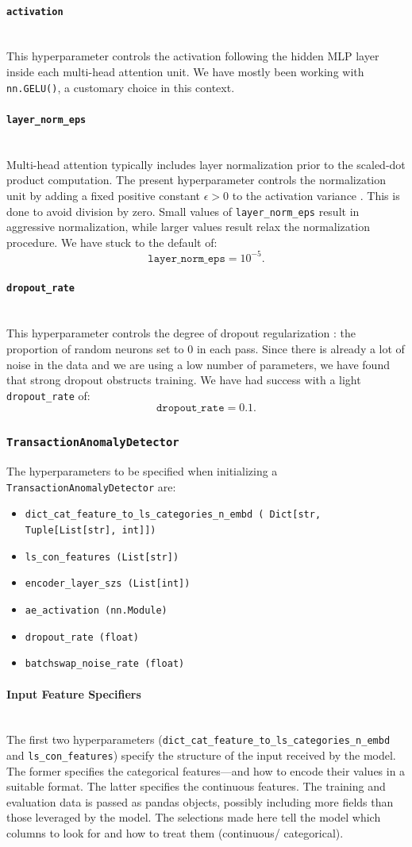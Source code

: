 \documentclass[a4paper, 10pt]{article}
\theoremstyle{plain}
\theoremstyle{definition}
\numberwithin{equation}{section}
\newcommand{\subsubsubsection}[1]{\paragraph{#1}\mbox{}\\}
\begin{document}
\subsubsubsection{\texttt{activation}}
This hyperparameter controls the activation following the hidden MLP layer inside each multi-head attention unit. We have mostly been working with \texttt{nn.GELU()}, a customary choice in this context.
\subsubsubsection{\texttt{layer\_norm\_eps}}
Multi-head attention typically includes layer normalization \cite{LayerNorm} prior to the scaled-dot product computation. The present hyperparameter controls the normalization unit by adding a fixed positive constant $\epsilon >0$ to the activation variance \cite{LayerNorm}. This is done to avoid division by zero. Small values of \texttt{layer\_norm\_eps} result in aggressive normalization, while larger values result relax the normalization procedure. We have stuck to the default of:
\begin{equation}\nonumber
    \texttt{layer\_norm\_eps} = 10^{-5}.
\end{equation}
\subsubsubsection{\texttt{dropout\_rate}}
This hyperparameter controls the degree of dropout regularization \cite{Dropout}: the proportion of random neurons set to 0 in each pass. Since there is already a lot of noise in the data and we are using a low number of parameters, we have found that strong dropout obstructs training. We have had success with a light \texttt{dropout\_rate} of:
\begin{equation}\nonumber
    \texttt{dropout\_rate} = 0.1.
\end{equation}
\subsubsection{\texttt{TransactionAnomalyDetector}}

The hyperparameters to be specified when initializing a \texttt{TransactionAnomalyDetector} are:
\begin{itemize}
    \item \texttt{dict\_cat\_feature\_to\_ls\_categories\_n\_embd ( Dict[str, Tuple[List[str], int]])}
    \item \texttt{ls\_con\_features (List[str])}
    \item \texttt{encoder\_layer\_szs (List[int])}
    \item \texttt{ae\_activation (nn.Module)}
    \item \texttt{dropout\_rate (float)}
    \item \texttt{batchswap\_noise\_rate (float)}
\end{itemize}

\subsubsubsection{Input Feature Specifiers}
The first two hyperparameters (\texttt{dict\_cat\_feature\_to\_ls\_categories\_n\_embd} and \texttt{ls\_con\_features}) specify the structure of the input received by the model. The former specifies the categorical features---and how to encode their values in a suitable format. The latter specifies the continuous features. The training and evaluation data is passed as pandas objects, possibly including more fields than those leveraged by the model. The selections made here tell the model which columns to look for and how to treat them (continuous/ categorical).
\end{document}
